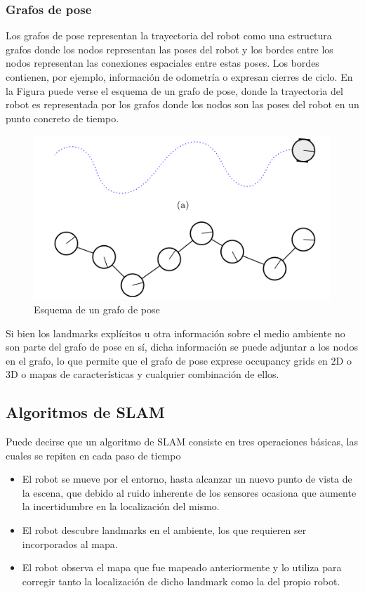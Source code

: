 \subsubsection{Grafos de pose}
Los grafos de pose representan la trayectoria del robot como una estructura grafos donde los nodos representan las poses del robot y los bordes entre los nodos representan las conexiones espaciales entre estas poses. Los bordes contienen, por ejemplo, información de odometría o expresan cierres de ciclo. En la Figura puede verse el esquema de un grafo de pose, donde la trayectoria del robot es representada por los grafos donde los nodos son las poses del robot en un punto concreto de tiempo.
\begin{figure}[!ht]
    \centering
    \includegraphics[width=\textwidth]{Img/PoseGraphStructure.png}
    \caption{Esquema de un grafo de pose}
    \label{fig:posegraphstructure}
\end{figure}

Si bien los landmarks explícitos u otra información sobre el medio ambiente no son parte del grafo de pose en sí, dicha información se puede adjuntar a los nodos en el grafo, lo que permite que el grafo de pose exprese occupancy grids en 2D o 3D o mapas de características y cualquier combinación de ellos.

\subsection{Algoritmos de SLAM}
Puede decirse que un algoritmo de SLAM consiste en tres operaciones básicas, las cuales se repiten en cada paso de tiempo
\begin{itemize}
    \item El robot se mueve por el entorno, hasta alcanzar un nuevo punto de vista de la escena, que debido al ruido inherente de los sensores ocasiona que aumente la incertidumbre en la localización del mismo.
    \item El robot descubre landmarks en el ambiente, los que requieren ser incorporados al mapa.
    \item El robot observa el mapa que fue mapeado anteriormente y lo utiliza para corregir tanto la localización de dicho landmark como la del propio robot.
\end{itemize}

